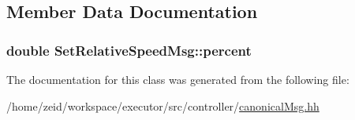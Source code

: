 \subsection{Member Data Documentation}
\hypertarget{class_set_relative_speed_msg_a2c6f3f77173fc32b66528f4d761f7283}{
\subsubsection[{percent}]{\setlength{\rightskip}{0pt plus 5cm}double {\bf SetRelativeSpeedMsg::percent}}}
\label{class_set_relative_speed_msg_a2c6f3f77173fc32b66528f4d761f7283}


The documentation for this class was generated from the following file:\begin{DoxyCompactItemize}
\item 
/home/zeid/workspace/executor/src/controller/\hyperlink{canonical_msg_8hh}{canonicalMsg.hh}\end{DoxyCompactItemize}
